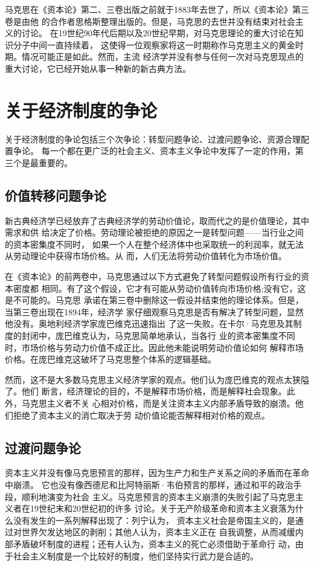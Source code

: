 马克思在《资本论》第二、三卷出版之前就于1883年去世了，所以《资本论》第三卷是由他
的合作者思格斯整理出版的。但是，马克思的去世并没有结束对社会主义的讨论。
在19世纪90年代后期以及20世纪早期，对马克思理论的重大讨论在知识分子中间一直持续着，
这使得一位观察家将这一时期称作马克思主义的黄金时期。情况可能正是如此。然而，主流
经济学并没有参与任何一次对马克思现点的重大讨论，它已经开始从事一种新的新古典方法。

\section{关于经济制度的争论}

关于经济制度的争论包括三个次争论：转型问题争论、过渡问题争论、资源合理配置争论。
每一个都在更广泛的社会主义、资本主义争论中发挥了一定的作用，第三个是最重要的。

\subsection{价值转移问题争论}

新古典经济学已经放弃了古典经济学的劳动价值论，取而代之的是价值理论，其中需求和供
给决定了价格。劳动理论被拒绝的原因之一是转型问题——当行业之间的资本密集度不同时，
如果一个人在整个经济体中也采取统一的利润率，就无法从劳动理论中获得市场价格。从
而，人们无法将劳动价值转化为市场价值。

在《资本论》的前两卷中，马克思通过以下方式避免了转型问题假设所有行业的资本密度都
相同。有了这个假设，它才有可能从劳动价值转向市场价格;没有它，这是不可能的。马克思
承诺在第三卷中删除这一假设并结束他的理论体系。但是，当第三卷出现在1894年，经济学
家仔细观察马克思是否有解决了转型问题，显然他没有。奥地利经济学家庞巴维克迅速指出
了这一失败。在卡尔·马克思及其制度的封闭中，庞巴维克认为，马克思简单地承认，当各行
业的资本密集度不同时，市场价格与劳动力价值不成正比。因此他未能说明劳动价值论如何
解释市场价格。在庞巴维克这破坏了马克思整个体系的逻辑基础。

然而，这不是大多数马克思主义经济学家的观点。他们认为庞巴维克的观点太狭隘了。他们
断言，经济理论的目的，不是解释市场价格，而是解释社会现象。此外，马克思主义者不关
心相对价格，而是关注资本主义内部矛盾导致的崩溃。他们拒绝了资本主义的消亡取决于劳
动价值论能否解释相对价格的观点。

\subsection{过渡问题争论}

资本主义并没有像马克思预言的那样，因为生产力和生产关系之间的矛盾而在革命中崩溃。
它也没有像西德尼和比阿特丽斯·韦伯预言的那样，通过和平的政治手段，顺利地演变为社会
主义。马克思预言的资本主义崩溃的失败引起了马克思主义者在19世纪末和20世纪初的许多
讨论。关于无产阶级革命和资本主义衰落为什么没有发生的一系列解释出现了：列宁认为，
资本主义社会是帝国主义的，是通过对世界欠发达地区的剥削；其他人认为，资本主义正在
自我调整，从而减缓内部矛盾破坏制度的进程；还有人认为，资本主义的死亡必须借助于革命行
动，由于社会主义制度是一个比较好的制度，他们坚持实行武力是合适的。

